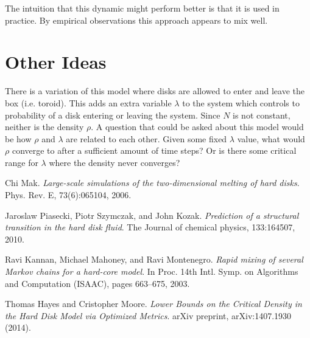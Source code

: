 \documentclass[a4paper,11pt]{article}
\begin{document}
The intuition that this dynamic might perform better is that it is used in practice.  By empirical observations this approach appears to mix well.

\section*{Other Ideas}

There is a variation of this model where disks are allowed to enter and leave the box (i.e. toroid).  This adds an extra variable $\lambda$ to the system which controls to probability of a disk entering or leaving the system.  Since $N$ is not constant, neither is the density $\rho$.  A question that could be asked about this model would be how $\rho$ and $\lambda$ are related to each other.  Given some fixed $\lambda$ value, what would $\rho$ converge to after a sufficient amount of time steps? Or is there some critical range for $\lambda$ where the density never converges?

\begin{thebibliography}{9}


  Chi Mak. 
  \emph{Large-scale simulations of the two-dimensional melting of hard disks}.
  Phys. Rev. E,
  73(6):065104, 2006.

  Jaroslaw Piasecki, Piotr Szymczak, and John Kozak.
  \emph{Prediction of a structural transition in the hard disk fluid}.
  The Journal of chemical physics,
  133:164507, 2010.

  Ravi Kannan, Michael Mahoney, and Ravi Montenegro.
  \emph{Rapid mixing of several Markov chains for a hard-core model}.
  In Proc. 14th Intl. Symp. on Algorithms and Computation (ISAAC),
  pages 663–675, 2003.

  Thomas Hayes and Cristopher Moore.
  \emph{Lower Bounds on the Critical Density in the Hard Disk Model via Optimized Metrics}.
  arXiv preprint,
  arXiv:1407.1930 (2014).

\end{thebibliography}
\end{document}
